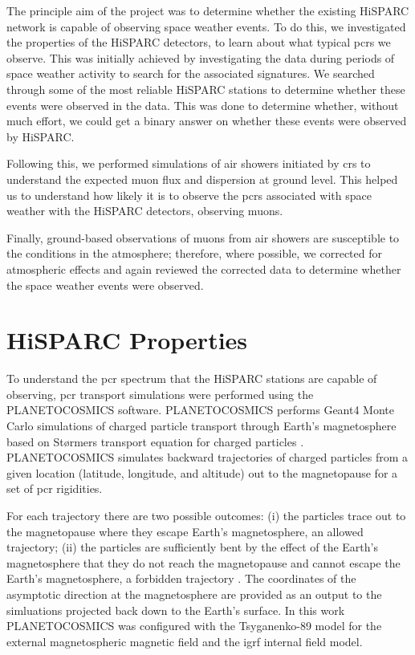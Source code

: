 The principle aim of the project was to determine whether the existing HiSPARC network is capable of observing space weather events. To do this, we investigated the properties of the HiSPARC detectors, to learn about what typical \glspl{pcr} we observe. This was initially achieved by investigating the data during periods of space weather activity to search for the associated signatures. We searched through some of the most reliable HiSPARC stations to determine whether these events were observed in the data. This was done to determine whether, without much effort, we could get a binary answer on whether these events were observed by HiSPARC.

Following this, we performed simulations of air showers initiated by \glspl{cr} to understand the expected muon flux and dispersion at ground level. This helped us to understand how likely it is to observe the \glspl{pcr} associated with space weather with the HiSPARC detectors, observing muons.

Finally, ground-based observations of muons from air showers are susceptible to the conditions in the atmosphere; therefore, where possible, we corrected for atmospheric effects and again reviewed the corrected data to determine whether the space weather events were observed.

\section{HiSPARC Properties}\label{sec:HS_properties}

To understand the \gls{pcr} spectrum that the HiSPARC stations are capable of observing, \gls{pcr} transport simulations were performed using the PLANETOCOSMICS software. PLANETOCOSMICS performs Geant4 Monte Carlo simulations of charged particle transport through Earth's magnetosphere based on St\o rmers transport equation for charged particles \citep{desorgher_planetocosmics_2006}. PLANETOCOSMICS simulates backward trajectories of charged particles from a given location (latitude, longitude, and altitude) out to the magnetopause for a set of \gls{pcr} rigidities. 

For each trajectory there are two possible outcomes: (i) the particles trace out to the magnetopause where they escape Earth's magnetosphere, an allowed trajectory; (ii) the particles are sufficiently bent by the effect of the Earth's magnetosphere that they do not reach the magnetopause and cannot escape the Earth's magnetosphere, a forbidden trajectory \citep{desorgher_planetocosmics_2006}. The coordinates of the asymptotic direction at the magnetosphere are provided as an output to the simluations projected back down to the Earth's surface. In this work PLANETOCOSMICS was configured with the Tsyganenko-89 model for the external magnetospheric magnetic field and the \gls{igrf} internal field model.

